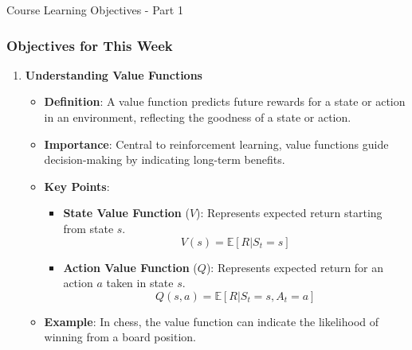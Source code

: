 \documentclass[aspectratio=169]{beamer}
\begin{document}
\begin{frame}[fragile]{Course Learning Objectives - Part 1}
    \frametitle{Objectives for This Week}

    \begin{enumerate}
        \item \textbf{Understanding Value Functions}
        \begin{itemize}
            \item \textbf{Definition}: A value function predicts future rewards for a state or action in an environment, reflecting the goodness of a state or action.
            \item \textbf{Importance}: Central to reinforcement learning, value functions guide decision-making by indicating long-term benefits.
            \item \textbf{Key Points}:
            \begin{itemize}
                \item \textbf{State Value Function} (\( V \)): Represents expected return starting from state \( s \).
                \begin{equation}
                V(s) = \mathbb{E} [R | S_t = s]
                \end{equation}
                \item \textbf{Action Value Function} (\( Q \)): Represents expected return for an action \( a \) taken in state \( s \).
                \begin{equation}
                Q(s, a) = \mathbb{E} [R | S_t = s, A_t = a]
                \end{equation}
            \end{itemize}
            \item \textbf{Example}: In chess, the value function can indicate the likelihood of winning from a board position.
        \end{itemize}
    \end{enumerate}
\end{frame}
\end{document}
